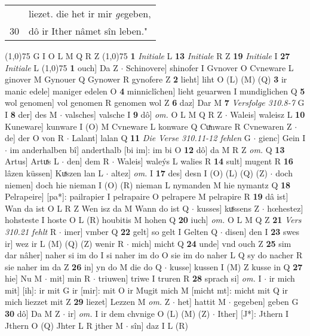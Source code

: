 \documentclass[8pt,a4paper,notitlepage]{article}
\begin{document}
\begin{table}[ht]
\begin{minipage}[t]{0.5\linewidth}
\begin{tabular}{rl}
 & liezet. die het ir mir \textit{ge}geben,\\ 
30 & dô ir Ither nâmet sîn leben."\\ 
\end{tabular}
\scriptsize
\line(1,0){75} \newline
G I O L M Q R Z \newline
\line(1,0){75} \newline
\textbf{1} \textit{Initiale} L  \textbf{13} \textit{Initiale} R Z  \textbf{19} \textit{Initiale} I  \textbf{27} \textit{Initiale} L  \newline
\line(1,0){75} \newline
\textbf{1} ouch] Da Z  $\cdot$ Schinovere] shinofer I Gvnover O Cvneware L ginover M Gynouer Q Gynower R gynofere Z \textbf{2} lieht] liht O (L) (M) (Q) \textbf{3} ir manic edele] maniger edelen O \textbf{4} minniclîchen] lieht geuarwen I mundiglichen Q \textbf{5} wol genomen] vol genomen R genomen wol Z \textbf{6} daz] Dar M \textbf{7} \textit{Versfolge 310.8-7} G I  \textbf{8} der] des M  $\cdot$ valsches] valsche I \textbf{9} dô] \textit{om.} O L M Q R Z  $\cdot$ Waleis] waleisz L \textbf{10} Kuneware] kunware I (O) M Cvneware L konware Q Cuͯnware R Cvnewaren Z  $\cdot$ de] der O von R  $\cdot$ Lalant] lalan Q \textbf{11} \textit{Die Verse 310.11-12 fehlen} G   $\cdot$ gienc] Gein I  $\cdot$ im anderhalben bî] anderthalb [bi im]: im bi O \textbf{12} dô] da M R Z \textit{om.} Q \textbf{13} Artus] Artuͯs L  $\cdot$ den] dem R  $\cdot$ Waleis] waleýs L walies R \textbf{14} sult] mugent R \textbf{16} lâzen küssen] Kuͯszen lan L  $\cdot$ altez] \textit{om.} I \textbf{17} des] desn I (O) (L) (Q) (Z)  $\cdot$ doch niemen] doch hie nieman I (O) (R) nieman L nymanden M hie nymantz Q \textbf{18} Pelrapeire] [pa*]: pailrapier I pelrapaire O pelrapere M pelrapire R \textbf{19} dâ ist] Wan da ist O L R Z Wen isz da M Wann do ist Q  $\cdot$ kusses] kuͤssens Z  $\cdot$ hœhestez] hohsteste I hoste O L (R) houbitis M hohen Q \textbf{20} iuch] \textit{om.} O L M Q Z \textbf{21} \textit{Vers 310.21 fehlt} R   $\cdot$ imer] vmber Q \textbf{22} gelt] so gelt I Gelten Q  $\cdot$ disen] den I \textbf{23} swes ir] wez ir L (M) (Q) (Z) wenir R  $\cdot$ mich] micht Q \textbf{24} unde] vnd ouch Z \textbf{25} sim dar nâher] naher si im do I si naher im do O sie im do naher L Q sy do nacher R sie naher im da Z \textbf{26} in] yn do M die do Q  $\cdot$ kusse] kussen I (M) Z kusse in Q \textbf{27} hie] Nu M  $\cdot$ mit] min R  $\cdot$ triuwen] triwe I truren R \textbf{28} sprach si] \textit{om.} I  $\cdot$ ir mich mit] [ih]: ir mit G ir [mir]: mit O ir Mugit mich M [micht mt]: micht mit Q ir mich liezzet mit Z \textbf{29} liezet] Lezzen M \textit{om.} Z  $\cdot$ het] hattit M  $\cdot$ gegeben] geben G \textbf{30} dô] Da M Z  $\cdot$ ir] \textit{om.} I ir dem chvnige O (L) (M) (Z)  $\cdot$ Ither] [J*]: Jthern I Jthern O (Q) Jhter L R jther M  $\cdot$ sîn] daz I L (R) \newline

\end{minipage}
\end{table}
\end{document}
